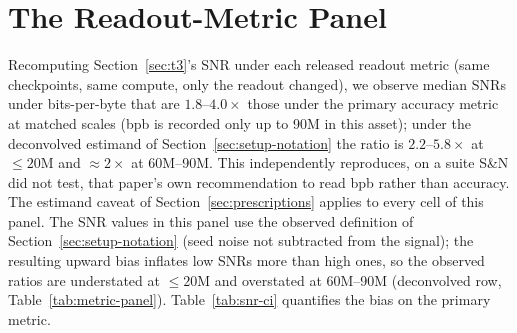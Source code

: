 
\section{The Readout-Metric Panel}
\label{app:metric-panel}

Recomputing
Section~\ref{sec:t3}'s SNR under each released readout metric (same checkpoints, same compute,
only the readout changed), we observe median SNRs under bits-per-byte that are $1.8$--$4.0\times$
those under the primary accuracy metric at matched scales (bpb is recorded only up to 90M in
this asset); under the deconvolved estimand of Section~\ref{sec:setup-notation} the ratio is
$2.2$--$5.8\times$ at ${\le}20$M and ${\approx}2\times$ at 60M--90M. This independently reproduces, on a suite S\&N did not test, that paper's own
recommendation to read bpb rather than accuracy. The estimand caveat of
Section~\ref{sec:prescriptions} applies to every cell of this panel. The SNR values in this
panel use the observed definition of Section~\ref{sec:setup-notation} (seed noise not
subtracted from the signal); the resulting upward bias inflates low SNRs more than high
ones, so the observed ratios are understated at ${\le}20$M and overstated at 60M--90M
(deconvolved row, Table~\ref{tab:metric-panel}).
Table~\ref{tab:snr-ci} quantifies the bias on the primary metric.

